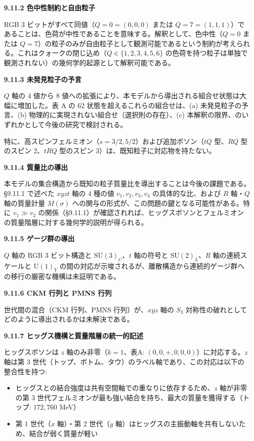 \documentclass[
  a4paper,11pt]{ltjsarticle}
\providecommand{\tightlist}{%
  \setlength{\itemsep}{0pt}\setlength{\parskip}{0pt}}
\theoremstyle{definition}
\theoremstyle{remark}
\begin{document}
\textbf{9.11.2 色中性制約と自由粒子}

RGB 3 ビットがすべて同値（\(Q = 0 = (0,0,0)\) または
\(Q = 7 = (1,1,1)\)）であることは、色荷が中性であることを意味する。解釈として、色中性（\(Q = 0\)
または
\(Q = 7\)）の粒子のみが自由粒子として観測可能であるという制約が考えられる。これはクォークの閉じ込め（\(Q \in \{1, 2, 3, 4, 5, 6\}\)
の色荷を持つ粒子は単独で観測されない）の幾何学的起源として解釈可能である。

\textbf{9.11.3 未発見粒子の予言}

\(Q\) 軸の 4 値から 8
値への拡張により、本モデルから導出される組合せ状態は大幅に増加した。表 A
の 62 状態を超えるこれらの組合せは、(a) 未発見粒子の予言、(b)
物理的に実現されない組合せ（選択則の存在）、(c)
本解釈の限界、のいずれかとして今後の研究で検討される。

特に、高スピンフェルミオン（\(s = 3/2, 5/2\)）および追加ボソン（\(tQ\)
型、\(RQ\) 型のスピン 2、\(tRQ\) 型のスピン
3）は、既知粒子に対応物を持たない。

\textbf{9.11.4 質量比の導出}

本モデルの集合構造から既知の粒子質量比を導出することは今後の課題である。§9.11.1
で述べた \(xyzt\) 軸の 4 種の値 \(v_1, v_2, v_3, v_4\)
の具体的な比、および \(R\) 軸・\(Q\) 軸の質量計量 \(M(\sigma)\)
への関与の形式が、この問題の鍵となる可能性がある。特に \(v_1 \gg v_2\)
の関係（§9.11.1）が確認されれば、ヒッグスボソンとフェルミオンの質量階層に対する幾何学的説明が得られる。

\textbf{9.11.5 ゲージ群の導出}

\(Q\) 軸の RGB 3 ビット構造と \(\mathrm{SU}(3)_C\)、\(t\) 軸の符号と
\(\mathrm{SU}(2)_L\)、\(R\) 軸の連続スケールと \(\mathrm{U}(1)_Y\)
の間の対応が示唆されるが、離散構造から連続的ゲージ群への移行の厳密な機構は未証明である。

\textbf{9.11.6 CKM 行列と PMNS 行列}

世代間の混合（CKM 行列、PMNS 行列）が、\(xyz\) 軸の \(S_3\)
対称性の破れとしてどのように導出されるかは未解決である。

\textbf{9.11.7 ヒッグス機構と質量階層の統一的記述}

ヒッグスボソンは \(z\) 軸のみ非零（\(k = 1\)、表A:
\((0, 0, +, 0, 0, 0)\)）に対応する。\(z\) 軸は第 3
世代（トップ、ボトム、タウ）のラベル軸であり、この対応は以下の整合性を持つ:

\begin{itemize}
\tightlist
\item
  ヒッグスとの結合強度は共有空間軸での重なりに依存するため、\(z\)
  軸が非零の第 3
  世代フェルミオンが最も強い結合を持ち、最大の質量を獲得する（トップ:
  \(172{,}760\) MeV）
\item
  第 1 世代（\(x\) 軸）・第 2 世代（\(y\)
  軸）はヒッグスの主振動軸を共有しないため、結合が弱く質量が軽い
\end{itemize}
\end{document}

